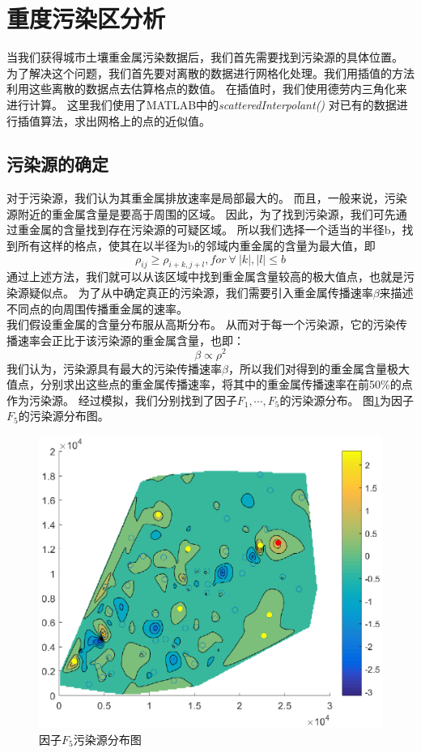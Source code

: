 \documentclass[a4paper]{article}
\begin{document}
\section{重度污染区分析}
当我们获得城市土壤重金属污染数据后，我们首先需要找到污染源的具体位置。\\
\indent 为了解决这个问题，我们首先要对离散的数据进行网格化处理。我们用插值的方法利用这些离散的数据点去估算格点的数值。
在插值时，我们使用德劳内三角化来进行计算。
这里我们使用了MATLAB中的\emph{scatteredInterpolant()} \cite{journals/jei/Amidror02}对已有的数据进行插值算法，求出网格上的点的近似值。
\subsection{污染源的确定}
对于污染源，我们认为其重金属排放速率是局部最大的。
而且，一般来说，污染源附近的重金属含量是要高于周围的区域。
因此，为了找到污染源，我们可先通过重金属的含量找到存在污染源的可疑区域。
所以我们选择一个适当的半径b，找到所有这样的格点，使其在以半径为b的邻域内重金属的含量为最大值，即
\begin{equation}
\rho_{ij} \geq \rho_{i+k, j+l}, for\ \forall \ |k|, |l| \le b
\end{equation}
通过上述方法，我们就可以从该区域中找到重金属含量较高的极大值点，也就是污染源疑似点。
为了从中确定真正的污染源，我们需要引入重金属传播速率$\beta$来描述不同点的向周围传播重金属的速率。\\
\indent 我们假设重金属的含量分布服从高斯分布。
从而对于每一个污染源，它的污染传播速率会正比于该污染源的重金属含量，也即：
\begin{equation}
\beta \propto \rho^2
\end{equation}
我们认为，污染源具有最大的污染传播速率$\beta$，所以我们对得到的重金属含量极大值点，分别求出这些点的重金属传播速率，将其中的重金属传播速率在前50\%的点作为污染源。
经过模拟，我们分别找到了因子$F_1,\cdots,F_5$的污染源分布。
图\ref{fig:polluted-source}为因子$F_5$的污染源分布图。
\begin{figure}
    \centering 
    \includegraphics[scale=0.9]{pictures/polluted-source.eps}
    \caption{因子$F_5$污染源分布图}
    \label{fig:polluted-source}
\end{figure}
\end{document}
